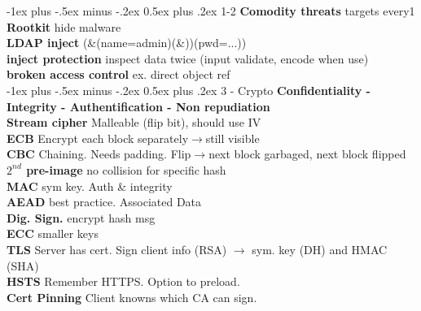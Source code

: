 \documentclass[10pt,landscape]{article}
\makeatletter
\renewcommand{\section}{\@startsection{section}{1}{0mm}%
                                {-1ex plus -.5ex minus -.2ex}%
                                {0.5ex plus .2ex}%
                                {\normalfont\large\bfseries}}
\makeatother
\begin{document}
\raggedright
\footnotesize
\begin{multicols*}{4}


\setlength{\premulticols}{1pt}
\setlength{\postmulticols}{1pt}
\setlength{\multicolsep}{1pt}
\setlength{\columnsep}{2pt}

\section{1-2}
\textbf{Comodity threats} targets every1\\
\textbf{Rootkit} hide malware\\
\textbf{LDAP inject} (\&(name=admin)(\&))(pwd=...))\\
\textbf{inject protection} inspect data twice (input validate, encode when use)\\
\textbf{broken access control} ex. direct object ref\\

\section{3 - Crypto}
\textbf{Confidentiality - Integrity - Authentification - Non repudiation}\\
\textbf{Stream cipher} Malleable (flip bit), should use IV\\
\textbf{ECB} Encrypt each block separately$\rightarrow$still visible\\
\textbf{CBC} Chaining. Needs padding. Flip$\rightarrow$next block garbaged, next block flipped\\
\textbf{$2^{nd}$ pre-image} no collision for specific hash\\
\textbf{MAC} sym key. Auth \& integrity\\
\textbf{AEAD} best practice. Associated Data\\
\textbf{Dig. Sign.} encrypt hash msg\\
\textbf{ECC} smaller keys\\
\textbf{TLS} Server has cert. Sign client info (RSA) $\rightarrow$ sym. key (DH) and HMAC (SHA)\\
\textbf{HSTS} Remember HTTPS. Option to preload.\\
\textbf{Cert Pinning} Client knowns which CA can sign.\\


\end{multicols*}
\end{document}
